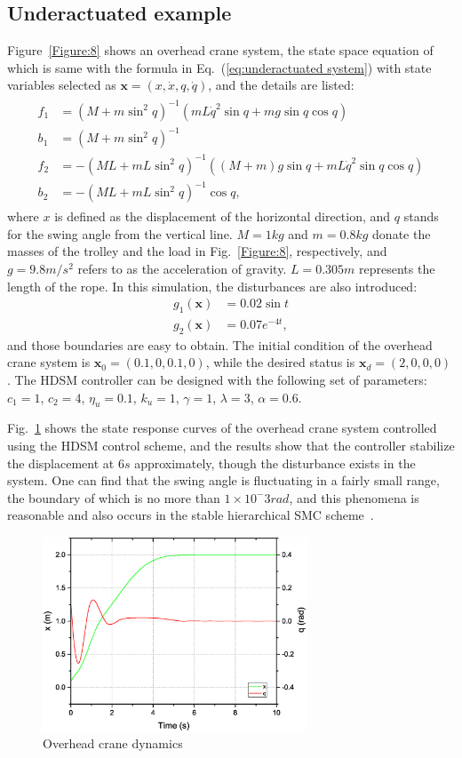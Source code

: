 \documentclass[3p]{elsarticle}
\theoremstyle{plain}
\theoremstyle{remark}
\begin{document}
\subsection{Underactuated example}
Figure~\ref{Figure:8} shows an overhead crane system, the state space equation of which is same with the formula in Eq.~(\ref{eq:underactuated system}) with state variables selected as $\bm x=(x,\dot x,q,\dot q)$, and the details are listed:
\begin{align}
\begin{split}
f_1&=(M+m\sin^2q)^{-1}(mL\dot q^2\sin q+mg\sin q\cos q)\\
b_1&=(M+m\sin^2q)^{-1}\\
f_2&=-(ML+mL\sin^2q)^{-1}((M+m)g\sin q+mL\dot q^2\sin q\cos q)\\
b_2&=-(ML+mL\sin^2q)^{-1}\cos q,
\end{split}
\end{align}
where $x$ is defined as the displacement of the horizontal direction, and $q$ stands for the swing angle from the vertical line. $M=1kg$ and $m=0.8kg$ donate the masses of the trolley and the load in Fig.~\ref{Figure:8}, respectively, and $g=9.8m/s^2$ refers to as the acceleration of gravity. $L=0.305m$ represents the length of the rope. In this simulation, the disturbances are also introduced:
\begin{align}
g_1(\bm x)&= 0.02\sin t\\
g_2(\bm x)&=0.07e^{-4t},
\end{align}
and those boundaries are easy to obtain. The initial condition of the overhead crane system is $\bm x_0 = (0.1,0,0.1,0)$, while the desired status is $\bm x_d = (2,0,0,0)$. The HDSM controller can be designed with the following set of parameters:
$c_1=1$, $c_2=4$, $\eta_u = 0.1$, $k_u=1$, $\gamma = 1$, $\lambda = 3$, $\alpha = 0.6$.\par
Fig.~\ref{Figure:9} shows the state response curves of the overhead crane system controlled using the HDSM control scheme, and the results show that the controller stabilize the displacement at $6s$ approximately, though the disturbance exists in the system. One can find that the swing angle is fluctuating in a fairly small range, the boundary of which is no more than $1\times 10^-3rad$, and this phenomena is reasonable and also occurs in the stable hierarchical SMC scheme~\cite{wang2004design}.
\begin{figure}[http]
\centering
\includegraphics[width=0.7\textwidth]{paper3_fig9.eps}
\caption{Overhead crane dynamics}
\label{Figure:9}
\end{figure}
\end{document}
